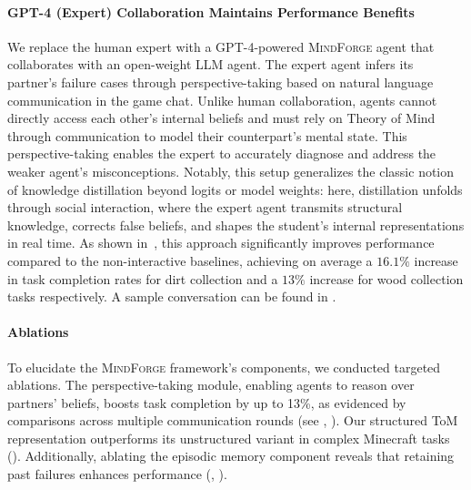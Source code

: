 \documentclass{article}
\newcommand{\collabvoyager}[0]{\mbox{\textsc{MindForge}}\xspace}
\begin{document}
\paragraph{GPT-4 (Expert) Collaboration Maintains Performance Benefits} We replace the human expert with a GPT-4-powered \collabvoyager agent that collaborates with an open-weight LLM agent. The expert agent infers its partner's failure cases through perspective-taking based on natural language communication in the game chat. Unlike human collaboration, agents cannot directly access each other's internal beliefs and must rely on Theory of Mind through communication to model their counterpart's mental state. This perspective-taking enables the expert to accurately diagnose and address the weaker agent's misconceptions. Notably, this setup generalizes the classic notion of knowledge distillation beyond logits or model weights: here, distillation unfolds through social interaction, where the expert agent transmits structural knowledge, corrects false beliefs, and shapes the student’s internal representations in real time. As shown in~, this approach significantly improves performance compared to the non-interactive baselines, achieving on average a $16.1\%$ increase in task completion rates for dirt collection and a $13\%$ increase for wood collection tasks respectively. A sample conversation can be found in .

\paragraph{Ablations} To elucidate the \collabvoyager framework's components, we conducted targeted ablations. The perspective-taking module, enabling agents to reason over partners' beliefs, boosts task completion by up to 13\%, as evidenced by comparisons across multiple communication rounds (see , ). Our structured ToM representation outperforms its unstructured variant in complex Minecraft tasks (). Additionally, ablating the episodic memory component reveals that retaining past failures enhances performance (, ).
\end{document}
